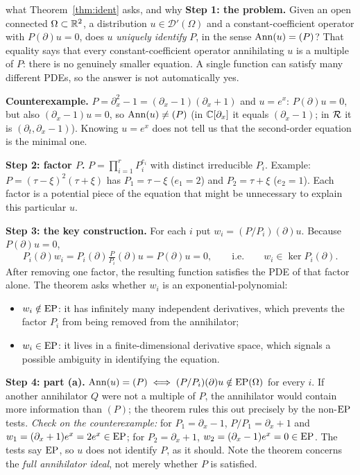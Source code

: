 \begin{explained}{what Theorem~\ref{thm:ident} asks, and why}
\textbf{Step 1: the problem.} Given an open connected $\Omega\subset\mathbb{R}^2$, a distribution $u\in\mathcal D'(\Omega)$ and a constant-coefficient operator with $P(\partial)u=0$, does $u$ \emph{uniquely identify} $P$, in the sense $\operatorname{Ann}(u)=(P)$? That equality says that every constant-coefficient operator annihilating $u$ is a multiple of $P$: there is no genuinely smaller equation. A single function can satisfy many different PDEs, so the answer is not automatically yes.

\medskip\textbf{Counterexample.} $P=\partial_x^2-1=(\partial_x-1)(\partial_x+1)$ and $u=e^x$: $P(\partial)u=0$, but also $(\partial_x-1)u=0$, so $\operatorname{Ann}(u)\ne(P)$ (in $\mathbb{C}[\partial_x]$ it equals $(\partial_x-1)$; in $\mathcal{R}$ it is $(\partial_t,\partial_x-1)$). Knowing $u=e^x$ does not tell us that the second-order equation is the minimal one.

\medskip\textbf{Step 2: factor $P$.} $P=\prod_{i=1}^rP_i^{e_i}$ with distinct irreducible $P_i$. Example: $P=(\tau-\xi)^2(\tau+\xi)$ has $P_1=\tau-\xi$ ($e_1=2$) and $P_2=\tau+\xi$ ($e_2=1$). Each factor is a potential piece of the equation that might be unnecessary to explain this particular $u$.

\medskip\textbf{Step 3: the key construction.} For each $i$ put $w_i=(P/P_i)(\partial)u$. Because $P(\partial)u=0$,
\[
P_i(\partial)w_i=P_i(\partial)\tfrac{P}{P_i}(\partial)u=P(\partial)u=0,\qquad\text{i.e.}\qquad w_i\in\ker P_i(\partial).
\]
After removing one factor, the resulting function satisfies the PDE of that factor alone. The theorem asks whether $w_i$ is an exponential-polynomial:
\begin{itemize}[nosep]
\item $w_i\notin\mathrm{EP}$: it has infinitely many independent derivatives, which prevents the factor $P_i$ from being removed from the annihilator;
\item $w_i\in\mathrm{EP}$: it lives in a finite-dimensional derivative space, which signals a possible ambiguity in identifying the equation.
\end{itemize}

\medskip\textbf{Step 4: part (a).} $\operatorname{Ann}(u)=(P)\iff(P/P_i)(\partial)u\notin\mathrm{EP}(\Omega)$ for every $i$. If another annihilator $Q$ were not a multiple of $P$, the annihilator would contain more information than $(P)$; the theorem rules this out precisely by the non-$\mathrm{EP}$ tests. \emph{Check on the counterexample:} for $P_1=\partial_x-1$, $P/P_1=\partial_x+1$ and $w_1=(\partial_x+1)e^x=2e^x\in\mathrm{EP}$; for $P_2=\partial_x+1$, $w_2=(\partial_x-1)e^x=0\in\mathrm{EP}$. The tests say $\mathrm{EP}$, so $u$ does not identify $P$, as it should. Note the theorem concerns the \emph{full annihilator ideal}, not merely whether $P$ is satisfied.


\end{explained}
